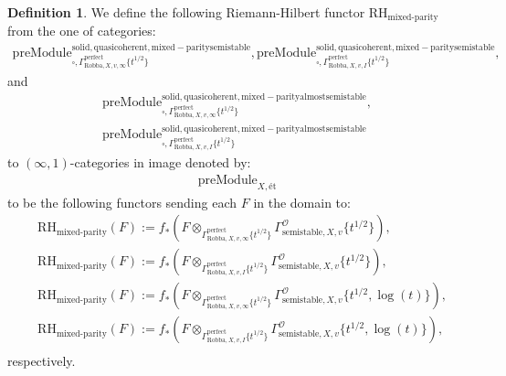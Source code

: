 \documentclass[12pt]{book}
\theoremstyle{definition}
\newtheorem{definition}{Definition}
\begin{document}
\begin{definition}
We define the following Riemann-Hilbert functor $\text{RH}_\text{mixed-parity}$ from the one of categories:
\begin{align}
\mathrm{preModule}^\mathrm{solid,quasicoherent,mixed-paritysemistable}_{\square,\Gamma^\mathrm{perfect}_{\text{Robba},X,v,\infty}\{t^{1/2}\}},
\mathrm{preModule}^\mathrm{solid,quasicoherent,mixed-paritysemistable}_{\square,\Gamma^\mathrm{perfect}_{\text{Robba},X,v,I}\{t^{1/2}\}}, 
\end{align}
and
\begin{align}
\mathrm{preModule}^\mathrm{solid,quasicoherent,mixed-parityalmostsemistable}_{\square,\Gamma^\mathrm{perfect}_{\text{Robba},X,v,\infty}\{t^{1/2}\}},\\
\mathrm{preModule}^\mathrm{solid,quasicoherent,mixed-parityalmostsemistable}_{\square,\Gamma^\mathrm{perfect}_{\text{Robba},X,v,I}\{t^{1/2}\}} 
\end{align}
to $(\infty,1)$-categories in image denoted by:
\begin{align}
\mathrm{preModule}_{X,\text{\'et}}
\end{align}
to be the following functors sending each $F$ in the domain to:
\begin{align}
&\text{RH}_\text{mixed-parity}(F):=f_*(F\otimes_{\Gamma^\mathrm{perfect}_{\text{Robba},X,v,\infty}\{t^{1/2}\}} \Gamma^\mathcal{O}_{\text{semistable},X,v}\{t^{1/2}\}),\\
&\text{RH}_\text{mixed-parity}(F):=f_*(F\otimes_{\Gamma^\mathrm{perfect}_{\text{Robba},X,v,I}\{t^{1/2}\}} \Gamma^\mathcal{O}_{\text{semistable},X,v}\{t^{1/2}\}),\\
&\text{RH}_\text{mixed-parity}(F):=f_*(F\otimes_{\Gamma^\mathrm{perfect}_{\text{Robba},X,v,\infty}\{t^{1/2}\}} \Gamma^\mathcal{O}_{\text{semistable},X,v}\{t^{1/2},\log(t)\}),\\
&\text{RH}_\text{mixed-parity}(F):=f_*(F\otimes_{\Gamma^\mathrm{perfect}_{\text{Robba},X,v,I}\{t^{1/2}\}} \Gamma^\mathcal{O}_{\text{semistable},X,v}\{t^{1/2},\log(t)\}),\\
\end{align}
respectively.

\end{definition}
\end{document}
